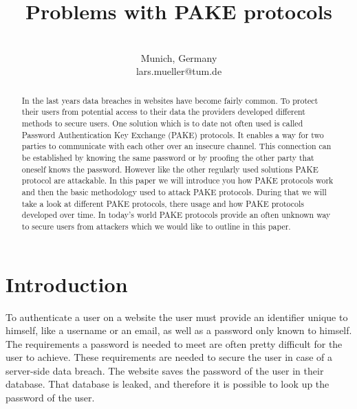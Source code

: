 \documentclass[journal]{IEEEtran}
\begin{document}
\title{Problems with PAKE protocols\\ %
}

\author{
 \\
Munich, Germany \\
lars.mueller@tum.de}

\maketitle

\begin{abstract}
In the last years data breaches in websites have become fairly common. To protect their users from potential access to their data the providers developed different methods to secure users.
One solution which is to date not often used is called Password Authentication Key Exchange (PAKE) protocols. It enables a way for two parties to communicate with each other over an insecure channel.
This connection can be established by knowing the same password or by proofing the other party that oneself knows the password.
However like the other regularly used solutions PAKE protocol are attackable. In this paper we will introduce you how PAKE protocols work and then the basic methodology used to attack PAKE protocols.
During that we will take a look at different PAKE protocols, there usage and how PAKE protocols developed over time.
In today's world PAKE protocols provide an often unknown way to secure users from attackers which we would like to outline in this paper.
\end{abstract}


\section{Introduction}
To authenticate a user on a website the user must provide an identifier unique to himself, like a username or an email, as well as a password only known to himself. 
The requirements a password is needed to meet are often pretty difficult for the user to achieve.
These requirements are needed to secure the user in case of a server-side data breach.
The website saves the password of the user in their database. That database is leaked, and therefore it is possible to look up the password of the user.
\end{document}
